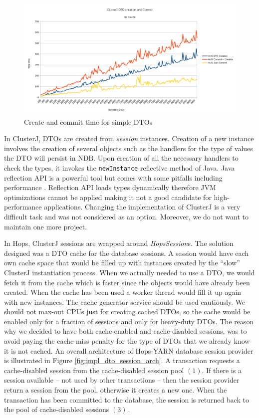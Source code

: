 \begin{figure}
\centering
\includegraphics[scale=0.55]{resources/images/Implementation/dto_create_commit_no_cache.png}
\caption{Create and commit time for simple DTOs}
\label{fig:impl_dto_no_cache}
\end{figure}

In ClusterJ, DTOs are created from \emph{session} instances. Creation
of a new instance involves the creation of several objects such as the
handlers for the type of values the DTO will persist in NDB. Upon creation
of all the necessary handlers to check the types, it invokes the
\texttt{newInstance} reflective method of Java. Java reflection API is
a powerful tool but comes with some pitfalls including
performance \cite{java_reflection}. Reflection API loads types dynamically therefore JVM
optimizations cannot be applied making it not a good candidate for
high-performance applications. Changing the implementation of ClusterJ
is a very difficult task and was not considered as an
option. Moreover, we do not want to maintain one more project.

In Hops, ClusterJ sessions are wrapped around \emph{HopsSession}s. The
solution designed was a DTO cache for the database sessions.
A session would have each own cache space that would be filled
up with instances created by the ``slow'' ClusterJ instantiation
process. When we actually needed to use a DTO, we would fetch it from
the cache which is faster since the objects would have already been
created. When the cache has been used a worker thread would fill it up
again with new instances. The cache generator service should be used
cautiously. We should not max-out CPUs just for creating cached DTOs, so the
cache would be enabled only for a fraction of sessions and only for
heavy-duty DTOs. The reason why we decided to have both cache-enabled
and cache-disabled sessions, was to avoid paying the
cache-miss penalty for the type of DTOs that we already know it is not
cached. An overall architecture of Hops-YARN database session provider
is illustrated in Figure \ref{fig:impl_dto_session_arch}. A
transaction requests a cache-disabled session from the cache-disabled
session pool $(1)$. If there is a session available -- not used by
other transactions -- then the session provider return a session from
the pool, otherwise it creates a new one. When the transaction has
been committed to the database, the session is returned back to the pool
of cache-disabled sessions $(3)$.

